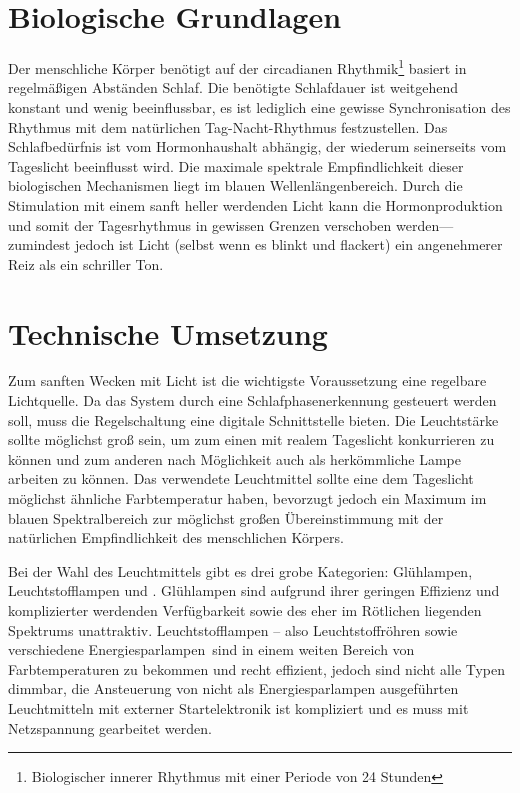 \documentclass[12pt,a4paper,notitlepage]{article}
\begin{document}
\section{Biologische Grundlagen}
Der menschliche Körper benötigt auf der circadianen Rhythmik\footnote{Biologischer innerer Rhythmus mit einer Periode von 24 Stunden} basiert in regelmäßigen Ab\-stän\-den Schlaf. Die benötigte Schlafdauer ist weitgehend konstant und wenig beeinflussbar, es ist lediglich eine gewisse Synchronisation des Rhythmus mit dem natürlichen Tag-Nacht-Rhythmus festzustellen. Das Schlafbedürfnis ist vom Hormonhaushalt abhängig\cite{WP9}, der wiederum seinerseits vom Tageslicht beeinflusst wird. Die maximale spektrale Empfindlichkeit dieser biologischen Mechanismen liegt im blauen Wellenlängenbereich.
\cite{WP5, WP6, WP7, WP8}
Durch die Stimulation mit einem sanft heller werdenden Licht kann die Hormonproduktion und somit der Tagesrhythmus in gewissen Grenzen verschoben werden---zumindest jedoch ist Licht (selbst wenn es blinkt und flackert) ein angenehmerer Reiz als ein schriller Ton.

\section{Technische Umsetzung}
Zum sanften Wecken mit Licht ist die wichtigste Voraussetzung eine regelbare Lichtquelle. Da das System durch eine Schlafphasenerkennung gesteuert werden soll, muss die Regelschaltung eine digitale Schnittstelle bieten. Die Leuchtstärke sollte möglichst groß sein, um zum einen mit realem Tageslicht konkurrieren zu können und zum anderen nach Möglichkeit auch als herkömmliche Lampe arbeiten zu können. Das verwendete Leuchtmittel sollte eine dem Tageslicht möglichst ähnliche Farbtemperatur haben, bevorzugt jedoch ein Maximum im blauen Spektralbereich zur möglichst großen Übereinstimmung mit der natürlichen Empfindlichkeit des menschlichen Körpers.

Bei der Wahl des Leuchtmittels gibt es drei grobe Kategorien: Glühlampen, Leuchtstofflampen und . Glühlampen sind aufgrund ihrer geringen Effizienz und komplizierter werdenden Verfügbarkeit sowie des eher im Rötlichen liegenden Spektrums unattraktiv. Leuchtstofflampen -- also Leuchtstoffröhren sowie verschiedene \glqq Energiesparlampen\grqq\ sind in einem weiten Bereich von Farbtemperaturen zu bekommen und recht effizient, jedoch sind nicht alle Typen dimmbar, die Ansteuerung von nicht als Energiesparlampen ausgeführten Leuchtmitteln mit externer Startelektronik ist kompliziert und es muss mit Netzspannung gearbeitet werden.
\end{document}
